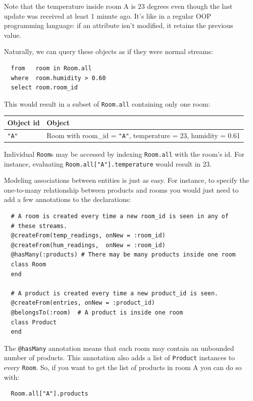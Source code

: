 \documentclass{report}
\begin{document}
Note that the temperature inside room A is 23 degrees even though the
last update was received at least 1 minute ago. It's like in a regular
OOP programming language: if an attribute isn't modified, it retains
the previous value.

Naturally, we can query these objects as if they were normal streams:

\begin{lstlisting}
  from   room in Room.all
  where  room.humidity > 0.60
  select room.room_id
\end{lstlisting}

This would result in a subset of \verb=Room.all= containing only one
room:

\begin{tabular}{ |l|l| }
  \hline
  Object id & Object \\
  \hline
  \verb="A"= & Room with room\_id = \verb="A"=, temperature = 23, humidity = 0.61 \\
  \hline
\end{tabular}

Individual \verb=Room=s may be accessed by indexing \verb=Room.all=
with the room's id. For instance, evaluating
\verb=Room.all["A"].temperature= would result in 23.

Modeling associations between entities is just as easy. For instance,
to specify the one-to-many relationship between products and rooms you
would just need to add a few annotations to the declarations:

\begin{lstlisting}
  # A room is created every time a new room_id is seen in any of
  # these streams.
  @createFrom(temp_readings, onNew = :room_id)
  @createFrom(hum_readings,  onNew = :room_id)
  @hasMany(:products) # There may be many products inside one room
  class Room
  end

  # A product is created every time a new product_id is seen.
  @createFrom(entries, onNew = :product_id)
  @belongsTo(:room)  # A product is inside one room
  class Product
  end
\end{lstlisting}

The \verb=@hasMany= annotation means that each room may contain an
unbounded number of products. This annotation also adds a list of
\verb=Product= instances to every \verb=Room=. So, if you want to get
the list of products in room A you can do so with:

\begin{lstlisting}
  Room.all["A"].products
\end{lstlisting}
\end{document}
